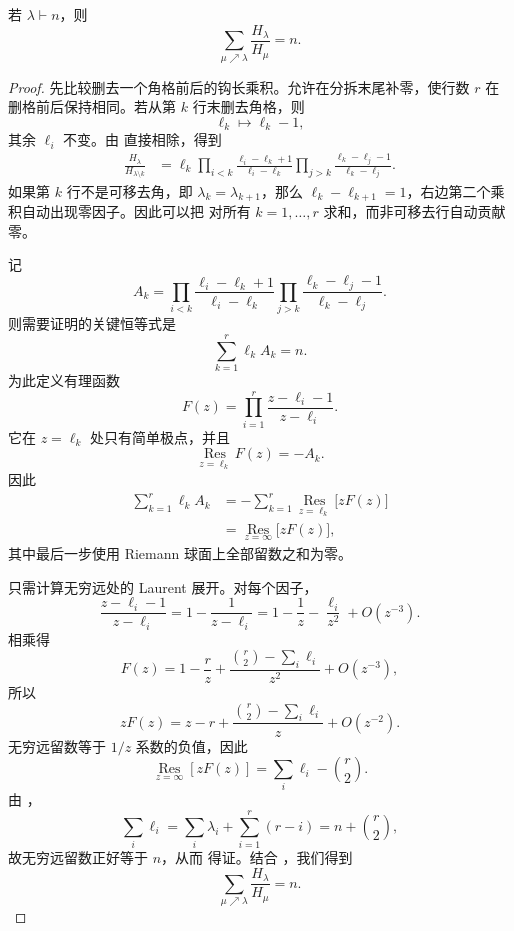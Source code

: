 \begin{lemma}[钩长乘积的角格递推]
若 $\lambda\vdash n$，则
\[
\sum_{\mu\nearrow\lambda}\frac{H_\lambda}{H_\mu}=n.
\]
\end{lemma}

\begin{proof}
先比较删去一个角格前后的钩长乘积。允许在分拆末尾补零，使行数 $r$ 在删格前后保持相同。若从第 $k$ 行末删去角格，则
\[
\ell_k\longmapsto\ell_k-1,
\]
其余 $\ell_i$ 不变。由  直接相除，得到
\begin{align}
\frac{H_\lambda}{H_{\lambda\setminus k}}
&=\ell_k
\prod_{i<k}
\frac{\ell_i-\ell_k+1}{\ell_i-\ell_k}
\prod_{j>k}
\frac{\ell_k-\ell_j-1}{\ell_k-\ell_j}.
\label{eq:hook-corner-ratio}
\end{align}
如果第 $k$ 行不是可移去角，即 $\lambda_k=\lambda_{k+1}$，那么 $\ell_k-\ell_{k+1}=1$，右边第二个乘积自动出现零因子。因此可以把  对所有 $k=1,\dots,r$ 求和，而非可移去行自动贡献零。

记
\[
A_k=
\prod_{i<k}
\frac{\ell_i-\ell_k+1}{\ell_i-\ell_k}
\prod_{j>k}
\frac{\ell_k-\ell_j-1}{\ell_k-\ell_j}.
\]
则需要证明的关键恒等式是
\begin{equation}
\sum_{k=1}^{r}\ell_kA_k=n.
\label{eq:hook-ratio-sum}
\end{equation}
为此定义有理函数
\[
F(z)=\prod_{i=1}^{r}\frac{z-\ell_i-1}{z-\ell_i}.
\]
它在 $z=\ell_k$ 处只有简单极点，并且
\[
\operatorname*{Res}_{z=\ell_k}F(z)=-A_k.
\]
因此
\begin{align*}
\sum_{k=1}^{r}\ell_kA_k
&=-\sum_{k=1}^{r}\operatorname*{Res}_{z=\ell_k}\bigl[zF(z)\bigr]\\
&=\operatorname*{Res}_{z=\infty}\bigl[zF(z)\bigr],
\end{align*}
其中最后一步使用 Riemann 球面上全部留数之和为零。

只需计算无穷远处的 Laurent 展开。对每个因子，
\[
\frac{z-\ell_i-1}{z-\ell_i}
=1-\frac{1}{z-\ell_i}
=1-\frac1z-\frac{\ell_i}{z^2}+O(z^{-3}).
\]
相乘得
\[
F(z)
=1-\frac rz
+\frac{\binom r2-\sum_i\ell_i}{z^2}
+O(z^{-3}),
\]
所以
\[
zF(z)
=z-r+\frac{\binom r2-\sum_i\ell_i}{z}+O(z^{-2}).
\]
无穷远留数等于 $1/z$ 系数的负值，因此
\[
\operatorname*{Res}_{z=\infty}[zF(z)]
=\sum_i\ell_i-\binom r2.
\]
由 ，
\[
\sum_i\ell_i
=\sum_i\lambda_i+\sum_{i=1}^{r}(r-i)
=n+\binom r2,
\]
故无穷远留数正好等于 $n$，从而  得证。结合 ，我们得到
\begin{equation}
\sum_{\mu\nearrow\lambda}\frac{H_\lambda}{H_\mu}=n.
\label{eq:hook-product-recursion}
\end{equation}
\end{proof}

